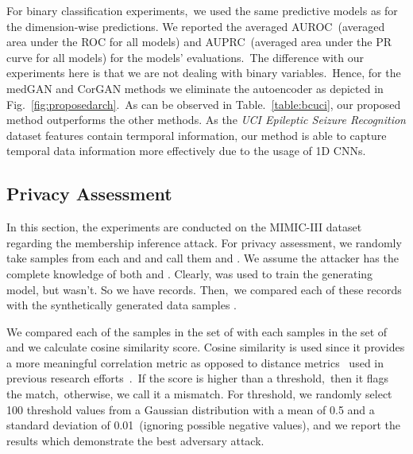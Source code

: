 \documentclass[letterpaper]{article} \usepackage{aaai20}  \usepackage{times}  \usepackage{helvet} \usepackage{courier}  \usepackage[hyphens]{url}  \usepackage{graphicx} \urlstyle{rm} \def\UrlFont{\rm}  \usepackage{graphicx}  \frenchspacing  \setlength{\pdfpagewidth}{8.5in}  \setlength{\pdfpageheight}{11in}
\begin{document}
For binary classification experiments,~we used the same predictive models as for the dimension-wise predictions. We reported the averaged AUROC~(averaged area under the ROC for all models) and AUPRC~(averaged area under the PR curve for all models) for the models' evaluations.~The difference with our experiments here is that we are not dealing with binary variables.~Hence, for the medGAN and CorGAN methods we eliminate the autoencoder as depicted in Fig.~\ref{fig:proposedarch}.~As can be observed in Table.~\ref{table:bcuci}, our proposed method outperforms the other methods. As the \textit{UCI Epileptic Seizure Recognition} dataset features contain termporal information, our method is able to capture temporal data information more effectively due to the usage of 1D CNNs.


\begin{table}[t]
\caption{Comparison of different generative models for binary classification. The averaged AUROC and AUROC for utilizing the predictive models on the real data are \textbf{0.95} and \textbf{0.46}.}
\centering
{}
\label{table:bcuci}
\end{table}


\subsection{Privacy Assessment}\label{sec:Experimentssub:privacy}

In this section, the experiments are conducted on the MIMIC-III dataset regarding the membership inference attack. For privacy assessment, we randomly take  samples from each  and  and call them  and . We assume the attacker has the complete knowledge of both  and . Clearly,  was used to train the generating model, but  wasn't. So we have  records. Then,~we compared each of these records with the synthetically generated data samples .


We compared each of the samples in the set of  with each samples in the set of  and we calculate cosine similarity score. Cosine similarity is used since it provides a more meaningful correlation metric as opposed to distance metrics~\cite{mateo2004outlier} used in previous research efforts~\cite{choi2017generating}.~If the score is higher than a threshold,~then it flags the match,~otherwise, we call it a mismatch. For threshold, we randomly select 100 threshold values from a Gaussian distribution with a mean of 0.5 and a standard deviation of 0.01~(ignoring possible negative values), and we report the results which demonstrate the best adversary attack.
\end{document}
